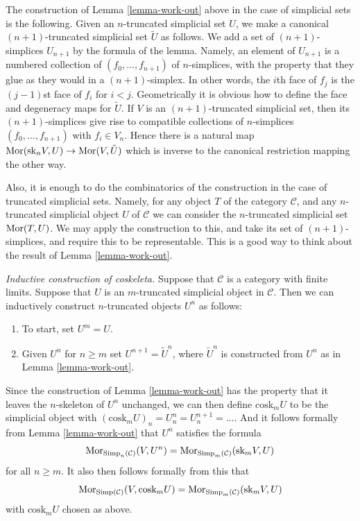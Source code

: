 \begin{remark}
\label{remark-cosk-simplicial-sets}
The construction of Lemma \ref{lemma-work-out}
above in the case of simplicial
sets is the following. Given an $n$-truncated simplicial
set $U$, we make a canonical $(n + 1)$-truncated simplicial
set $\tilde U$ as follows. We add a set of $(n + 1)$-simplices
$U_{n + 1}$ by the formula of the lemma. Namely,
an element of $U_{n + 1}$ is a numbered collection of
$(f_0, \ldots, f_{n + 1})$ of $n$-simplices,
with the property that they glue
as they would in a $(n + 1)$-simplex. In other words,
the $i$th face of $f_j$ is the $(j-1)$st face of $f_i$
for $i < j$. Geometrically it is obvious how to define the
face and degeneracy maps for $\tilde U$.
If $V$ is an $(n + 1)$-truncated simplicial set,
then its $(n + 1)$-simplices give rise to compatible collections
of $n$-simplices $(f_0, \ldots, f_{n + 1})$ with $f_i \in V_n$.
Hence there is a natural map
$\mathop{\mathrm{Mor}}\nolimits(\text{sk}_nV, U) \to \mathop{\mathrm{Mor}}\nolimits(V, \tilde U)$
which is inverse to the canonical restriction mapping
the other way.

\medskip\noindent
Also, it is enough to do the combinatorics of the
construction in the case of truncated simplicial sets.
Namely, for any object $T$ of the category $\mathcal{C}$,
and any $n$-truncated simplicial object $U$ of $\mathcal{C}$
we can consider the $n$-truncated simplicial set
$\mathop{\mathrm{Mor}}\nolimits(T, U)$. We may apply the construction to this,
and take its set of $(n + 1)$-simplices, and require this to be
representable. This is a good way to think about
the result of Lemma \ref{lemma-work-out}.
\end{remark}

\begin{remark}
\label{remark-inductive-coskeleton}
{\it Inductive construction of coskeleta.}
Suppose that $\mathcal{C}$ is a category with
finite limits. Suppose that $U$ is an $m$-truncated
simplicial object in $\mathcal{C}$. Then we can
inductively construct $n$-truncated objects $U^n$ as
follows:
\begin{enumerate}
\item To start, set $U^m = U$.
\item Given $U^n$ for $n \geq m$ set $U^{n + 1} = \tilde U^n$,
where $\tilde U^n$ is constructed from $U^n$ as in Lemma
\ref{lemma-work-out}.
\end{enumerate}
Since the construction of Lemma \ref{lemma-work-out} has
the property that it leaves the $n$-skeleton of $U^n$
unchanged, we can then define $\text{cosk}_m U$ to be
the simplicial object with
$(\text{cosk}_m U)_n = U^n_n = U^{n + 1}_n = \ldots$.
And it follows formally from Lemma \ref{lemma-work-out}
that $U^n$ satisfies the formula
$$
\mathop{\mathrm{Mor}}\nolimits_{\text{Simp}_n(\mathcal{C})}(V, U^n)
=
\mathop{\mathrm{Mor}}\nolimits_{\text{Simp}_m(\mathcal{C})}(\text{sk}_mV, U)
$$
for all $n \geq m$. It also then follows formally
from this that
$$
\mathop{\mathrm{Mor}}\nolimits_{\text{Simp}(\mathcal{C})}(V, \text{cosk}_mU)
=
\mathop{\mathrm{Mor}}\nolimits_{\text{Simp}_m(\mathcal{C})}(\text{sk}_mV, U)
$$
with $\text{cosk}_mU$ chosen as above.
\end{remark}

